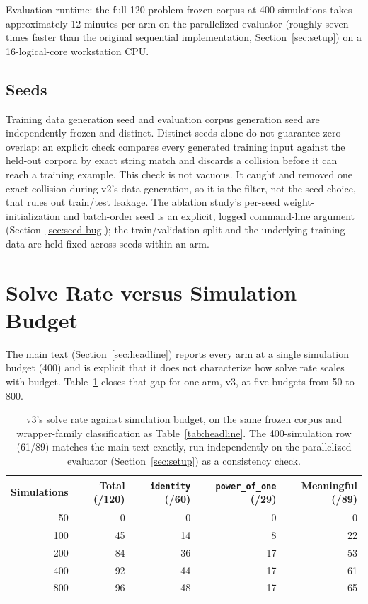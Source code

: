 \documentclass[11pt]{article}
\numberwithin{equation}{section}
\newcommand{\good}{89}
\begin{document}
Evaluation runtime: the full 120-problem frozen corpus at 400 simulations takes approximately 12 minutes per arm on the parallelized evaluator (roughly seven times faster than the original sequential implementation, Section~\ref{sec:setup}) on a 16-logical-core workstation CPU.

\subsection{Seeds}
Training data generation seed and evaluation corpus generation seed are independently frozen and distinct. Distinct seeds alone do not guarantee zero overlap: an explicit check compares every generated training input against the held-out corpora by exact string match and discards a collision before it can reach a training example. This check is not vacuous. It caught and removed one exact collision during v2's data generation, so it is the filter, not the seed choice, that rules out train/test leakage. The ablation study's per-seed weight-initialization and batch-order seed is an explicit, logged command-line argument (Section~\ref{sec:seed-bug}); the train/validation split and the underlying training data are held fixed across seeds within an arm.

\section{Solve Rate versus Simulation Budget}
\label{sec:budget-curve}

The main text (Section~\ref{sec:headline}) reports every arm at a single simulation budget (400) and is explicit that it does not characterize how solve rate scales with budget. Table~\ref{tab:budget} closes that gap for one arm, v3, at five budgets from 50 to 800.

\begin{table}[H]
\centering
\small
\begin{tabular}{@{}rrrrr@{}}
\toprule
Simulations & Total (/120) & \texttt{identity} (/60) & \texttt{power\_of\_one} (/29) & Meaningful (/\good{}) \\
\midrule
50  & 0  & 0  & 0  & 0 \\
100 & 45 & 14 & 8  & 22 \\
200 & 84 & 36 & 17 & 53 \\
400 & 92 & 44 & 17 & 61 \\
800 & 96 & 48 & 17 & 65 \\
\bottomrule
\end{tabular}
\caption{v3's solve rate against simulation budget, on the same frozen corpus and wrapper-family classification as Table~\ref{tab:headline}. The 400-simulation row (61/\good{}) matches the main text exactly, run independently on the parallelized evaluator (Section~\ref{sec:setup}) as a consistency check.}
\label{tab:budget}
\end{table}
\end{document}
